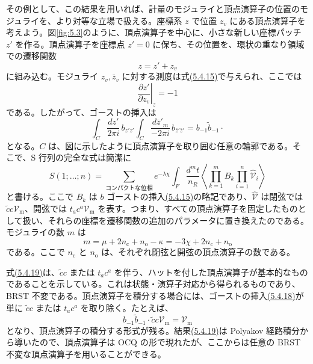 その例として、この結果を用いれば、計量のモジュライと頂点演算子の位置のモジュライを、より対等な立場で扱える。座標系 $z$ で位置 $z_v$ にある頂点演算子を考えよう。図\ref{fig:5.3}のように、頂点演算子を中心に、小さな新しい座標パッチ $z'$ を作る。頂点演算子を座標点 $z'=0$ に保ち、その位置を、環状の重なり領域での遷移関数
\begin{equation}
z=z'+z_v
\tag{5.4.16}\label{eq:5.4.16}
\end{equation}
に組み込む。モジュライ $z_v,\bar z_v$ に対する測度は式\hyperref[eq:5.4.15]{(5.4.15)}で与えられ、ここでは
\begin{equation}
\left.\frac{\partial z'}{\partial z_v}\right|_z=-1
\tag{5.4.17}\label{eq:5.4.17}
\end{equation}
である。したがって、ゴーストの挿入は
\begin{equation}
\int_C\frac{dz'}{2\pi i}\,b_{z'z'}
\int_C\frac{d\bar z'_m}{-2\pi i}\,b_{\bar z'\bar z'}
=b_{-1}\tilde b_{-1}\mathbin{\cdot}
\tag{5.4.18}\label{eq:5.4.18}
\end{equation}
となる。$C$ は、図に示したように頂点演算子を取り囲む任意の輪郭である。そこで、S 行列の完全な式は簡潔に
\begin{equation}
S(1;\ldots;n)
=\sum_{\text{コンパクトな位相}}
e^{-\lambda\chi}\int_F\frac{d^m t}{n_R}
\left\langle\prod_{k=1}^{m}B_k
\prod_{i=1}^{n}\hat{\mathcal V}_i\right\rangle
\tag{5.4.19}\label{eq:5.4.19}
\end{equation}
と書ける。ここで $B_k$ は $b$ ゴーストの挿入\hyperref[eq:5.4.15]{(5.4.15)}の略記であり、$\hat{\mathcal V}$ は閉弦では $\tilde c c\mathcal V_{\mathrm m}$、開弦では $t_ac^a\mathcal V_{\mathrm m}$ を表す。つまり、すべての頂点演算子を固定したものとして扱い、それらの座標を遷移関数の追加のパラメータに置き換えたのである。モジュライの数 $m$ は
\begin{equation}
m=\mu+2n_{\mathrm c}+n_{\mathrm o}-\kappa
=-3\chi+2n_{\mathrm c}+n_{\mathrm o}
\tag{5.4.20}\label{eq:5.4.20}
\end{equation}
である。ここで $n_{\mathrm c}$ と $n_{\mathrm o}$ は、それぞれ閉弦と開弦の頂点演算子の数である。

式\hyperref[eq:5.4.19]{(5.4.19)}は、$\tilde c c$ または $t_ac^a$ を伴う、ハットを付した頂点演算子が基本的なものであることを示している。これは状態・演算子対応から得られるものであり、BRST 不変である。頂点演算子を積分する場合には、ゴーストの挿入\hyperref[eq:5.4.18]{(5.4.18)}が単に $\tilde c c$ または $t_ac^a$ を取り除く。たとえば、
\begin{equation}
b_{-1}\tilde b_{-1}\mathbin{\cdot}
\tilde c c\mathcal V_{\mathrm m}=\mathcal V_{\mathrm m}
\tag{5.4.21}\label{eq:5.4.21}
\end{equation}
となり、頂点演算子の積分する形式が残る。結果\hyperref[eq:5.4.19]{(5.4.19)}は Polyakov 経路積分から導いたので、頂点演算子は OCQ の形で現れたが、ここからは任意の BRST 不変な頂点演算子を用いることができる。

